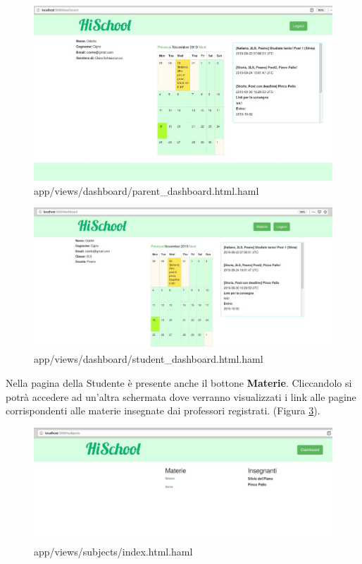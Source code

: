 \documentclass[Lau, binding=0.6cm, oneside]{sapthesis}
\begin{document}
\begin{figure}[H]
	\centering
	\includegraphics[width=1\linewidth]{images/p_dashboard} 
	\caption{app/views/dashboard/parent\_dashboard.html.haml}
	\label{fig:p_dashboard}
\end{figure}

\begin{figure}[H]
	\centering
	\includegraphics[width=1\linewidth]{images/s_dashboard} 
	\caption{app/views/dashboard/student\_dashboard.html.haml}
	\label{fig:s_dashboard}
\end{figure}

Nella pagina della Studente è presente anche il bottone \textbf{Materie}. Cliccandolo si potrà accedere ad un'altra schermata dove verranno visualizzati i link alle pagine corrispondenti alle materie insegnate dai professori registrati. (Figura \ref{fig:materie_page}).

\begin{figure}[H]
	\centering
	\includegraphics[width=1\linewidth]{images/materie_page} 
	\caption{app/views/subjects/index.html.haml}
	\label{fig:materie_page}
\end{figure}
\end{document}
